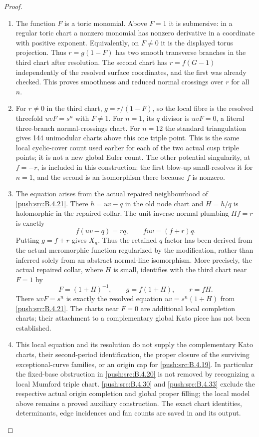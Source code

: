 \begin{proof}
\begin{enumerate}[label=\arabic*.,leftmargin=*]
\item The function $F$ is a toric monomial. Above $F=1$
it is submersive: in a regular toric chart a
nonzero monomial has nonzero derivative in a
coordinate with positive exponent. Equivalently,
on $F\ne0$ it is the displayed torus projection.
Thus $r=g(1-F)$ has two smooth transverse
branches in the third chart after resolution.
The second chart has $r=f(G-1)$ independently
of the resolved surface coordinates, and the
first was already checked. This proves smoothness
and reduced normal crossings over $r$ for all $n$.

\item For $r\ne0$ in the third chart,
$g=r/(1-F)$, so the local fibre is the resolved
threefold $uvF=s^n$ with $F\ne1$.
For $n=1$, its $q$ divisor is $uvF=0$, a literal
three-branch normal-crossings chart. For $n=12$
the standard triangulation gives 144 unimodular
charts above this one triple point. This is the
same local cyclic-cover count used earlier for
each of the two actual cusp triple points; it
is not a new global Euler count. The other
potential singularity, at $f=-r$, is included
in this construction: the first blow-up small-resolves it
for $n=1$, and the second is an isomorphism there
because $f$ is nonzero.

\item The equation arises from the actual repaired
neighbourhood of \ref{push:src:B.4.21}. There $h=uv-q$ in the
old node chart and $H=h/q$ is holomorphic in the
repaired collar. The unit inverse-normal plumbing
$Hf=r$ is exactly
\[
 f(uv-q)=rq,
 \qquad fuv=(f+r)q.
\]
Putting $g=f+r$ gives $X_n$. Thus the retained
$q$ factor has been derived from the actual
meromorphic function regularized by the
modification, rather than inferred solely from
an abstract normal-line isomorphism.
More precisely, the actual repaired collar, where $H$ is small,
identifies with the third chart near $F=1$ by
\[
 F=(1+H)^{-1},\qquad g=f(1+H),\qquad r=fH.
\]
There $uvF=s^n$ is exactly the resolved equation
$uv=s^n(1+H)$ from \ref{push:src:B.4.21}. The charts near $F=0$
are additional local completion charts; their attachment
to a complementary global Kato piece has not been established.

\item This local equation and its resolution do not
supply the complementary Kato charts, their
second-period identification, the proper closure
of the surviving exceptional-curve families, or
an origin cap for \ref{push:src:B.4.19}. In particular the
fixed-base obstruction in \ref{push:src:B.4.20} is not removed
by recognizing a local Mumford triple chart. \ref{push:src:B.4.30} and
\ref{push:src:B.4.33} exclude the respective actual origin completion
and global proper filling; the local model above remains
a proved auxiliary construction.
The exact chart identities, determinants, edge
incidences and fan counts are saved in
 and its
output.


\end{enumerate}
\end{proof}

